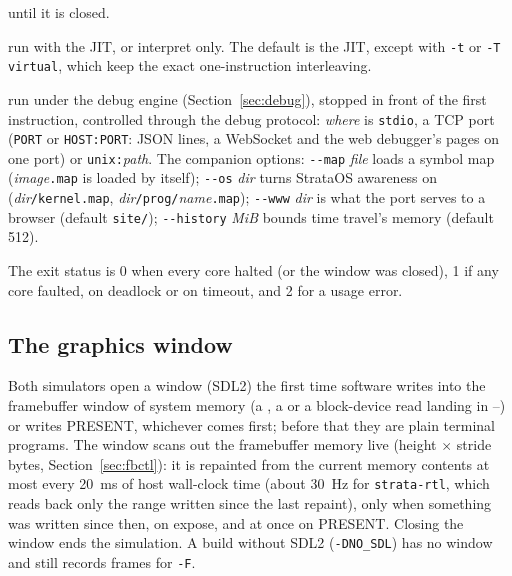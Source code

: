 \begin{description}[leftmargin=1em,style=nextline]
  until it is closed.
\item[\texttt{-J}, \texttt{-j}] run with the JIT, or interpret only. The default is the JIT, except
  with \texttt{-t} or \texttt{-T virtual}, which keep the exact one-instruction interleaving.
\item[\texttt{-{}-debug} \textit{where}] run under the debug engine (Section~\ref{sec:debug}), stopped in
  front of the first instruction, controlled through the debug protocol: \textit{where} is
  \texttt{stdio}, a TCP port (\texttt{PORT} or \texttt{HOST:PORT}: JSON lines, a WebSocket and the web
  debugger's pages on one port) or \texttt{unix:}\textit{path}. The companion options:
  \texttt{-{}-map} \textit{file} loads a symbol map (\textit{image}\texttt{.map} is loaded by itself);
  \texttt{-{}-os} \textit{dir} turns StrataOS awareness on (\textit{dir}\texttt{/kernel.map},
  \textit{dir}\texttt{/prog/}\textit{name}\texttt{.map}); \texttt{-{}-www} \textit{dir} is what the
  port serves to a browser (default \texttt{site/}); \texttt{-{}-history} \textit{MiB} bounds time
  travel's memory (default 512).
\end{description}
The exit status is 0 when every core halted (or the window was closed), 1 if any core faulted, on
deadlock or on timeout, and 2 for a usage error.

\subsection{The graphics window}\label{sec:window}

Both simulators open a window (SDL2) the first time software writes into the framebuffer window of
system memory (a , a  or a block-device read landing in
--) or writes PRESENT, whichever comes first; before that they are plain
terminal programs. The window scans out the framebuffer memory live (height $\times$ stride bytes,
Section~\ref{sec:fbctl}): it is repainted from the current memory contents at most every 20~ms of host
wall-clock time (about 30~Hz for \texttt{strata-rtl}, which reads back only the range written since the
last repaint), only when something was written since then, on expose, and at once on PRESENT. Closing
the window ends the simulation. A build without SDL2 (\texttt{-DNO\_SDL}) has no window and still
records frames for \texttt{-F}.

